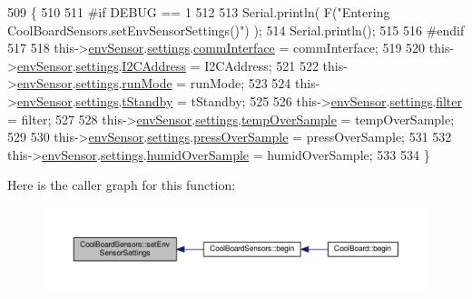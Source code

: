 \begin{DoxyCode}
509 \{
510 
511 \textcolor{preprocessor}{#if DEBUG == 1}
512     
513     Serial.println( F(\textcolor{stringliteral}{"Entering CoolBoardSensors.setEnvSensorSettings()"}) );
514     Serial.println();
515 
516 \textcolor{preprocessor}{#endif}
517   
518     this->\hyperlink{class_cool_board_sensors_a868e38985e9a2412829fa2790ca13e2e}{envSensor}.\hyperlink{class_b_m_e280_af06253eb2f8ad4b5fabb858bc4a973bf}{settings}.\hyperlink{struct_sensor_settings_a5bf116387c543a6ea5732976424e8cb1}{commInterface} = commInterface;      
519 
520     this->\hyperlink{class_cool_board_sensors_a868e38985e9a2412829fa2790ca13e2e}{envSensor}.\hyperlink{class_b_m_e280_af06253eb2f8ad4b5fabb858bc4a973bf}{settings}.\hyperlink{struct_sensor_settings_af8103021dbce7e5ee6d786c4893324f7}{I2CAddress} = I2CAddress;
521 
522     this->\hyperlink{class_cool_board_sensors_a868e38985e9a2412829fa2790ca13e2e}{envSensor}.\hyperlink{class_b_m_e280_af06253eb2f8ad4b5fabb858bc4a973bf}{settings}.\hyperlink{struct_sensor_settings_a0ffbdf34f4c23a2a167f00e4cb971dec}{runMode} = runMode; 
523 
524     this->\hyperlink{class_cool_board_sensors_a868e38985e9a2412829fa2790ca13e2e}{envSensor}.\hyperlink{class_b_m_e280_af06253eb2f8ad4b5fabb858bc4a973bf}{settings}.\hyperlink{struct_sensor_settings_a7098be3c1df0271dc9bc0fb45c1e9bb9}{tStandby} = tStandby; 
525 
526     this->\hyperlink{class_cool_board_sensors_a868e38985e9a2412829fa2790ca13e2e}{envSensor}.\hyperlink{class_b_m_e280_af06253eb2f8ad4b5fabb858bc4a973bf}{settings}.\hyperlink{struct_sensor_settings_a69dc95368069a0f408a141d4c2cbf045}{filter} = filter; 
527 
528     this->\hyperlink{class_cool_board_sensors_a868e38985e9a2412829fa2790ca13e2e}{envSensor}.\hyperlink{class_b_m_e280_af06253eb2f8ad4b5fabb858bc4a973bf}{settings}.\hyperlink{struct_sensor_settings_abdedc9d05f4850c58005313486958073}{tempOverSample} = tempOverSample;
529 
530     this->\hyperlink{class_cool_board_sensors_a868e38985e9a2412829fa2790ca13e2e}{envSensor}.\hyperlink{class_b_m_e280_af06253eb2f8ad4b5fabb858bc4a973bf}{settings}.\hyperlink{struct_sensor_settings_a85ba10cad25b479bba9cb42c6400ab21}{pressOverSample} = pressOverSample;
531 
532     this->\hyperlink{class_cool_board_sensors_a868e38985e9a2412829fa2790ca13e2e}{envSensor}.\hyperlink{class_b_m_e280_af06253eb2f8ad4b5fabb858bc4a973bf}{settings}.\hyperlink{struct_sensor_settings_a4a02fc7708071b88ccf610e3f7ed9d55}{humidOverSample} = humidOverSample;
533 
534 \}
\end{DoxyCode}
Here is the caller graph for this function\+:\nopagebreak
\begin{figure}[H]
\begin{center}
\leavevmode
\includegraphics[width=350pt]{de/d46/class_cool_board_sensors_a406307ffd70272282d91479c7ed8d66f_icgraph}
\end{center}
\end{figure}


